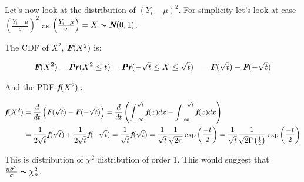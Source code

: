 Let's now look at the distribution of $(Y_i -\mu)^2$. For simplicity let's look at case $\left(\frac{Y_i -\mu}{\sigma}\right)^2$ as $\left(\frac{Y_i -\mu}{\sigma}\right) = X \thicksim \textbf{\em N}(0,1)$.

The CDF of $X^2$, $\textbf{\em F}(X^2)$ is:

\begin{equation}
\begin{aligned}
\textbf{\em F}(X^2) & = \textbf{\em Pr}(X^2 \le t) = \textbf{\em Pr}(-\sqrt{t} \le X \le \sqrt{t}) 																									
								& = \textbf{\em F}(\sqrt{t}) - \textbf{\em F}(-\sqrt{t})					
\end{aligned}
\end{equation}

And the PDF $\textbf{\em f}(X^2):$

\begin{equation}
\begin{aligned}
\textbf{\em f}(X^2) & = \frac{d}{dt}\left(\textbf{\em F}(\sqrt{t}) - \textbf{\em F}(-\sqrt{t})\right) 
								  = \frac{d}{dt}\left(\int_{-\infty}^{\sqrt{t}}\textbf{\em f}(x)dx - \int_{-\infty}^{-\sqrt{t}}\textbf{\em f}(x)dx\right)\\
								& = \frac{1}{2\sqrt{t}}\textbf{\em f}(\sqrt{t}) + \frac{1}{2\sqrt{t}}\textbf{\em f}(-\sqrt{t})
								  = \frac{1}{\sqrt{t}}\textbf{\em f}(\sqrt{t})
								  = \frac{1}{\sqrt{t}}\frac{1}{\sqrt{2\pi}}\exp\left(\frac{-t}{2}\right)
									= \frac{1}{\sqrt{t}}\frac{1}{\sqrt{2}\Gamma\left(\frac{1}{2}\right)}\exp\left(\frac{-t}{2}\right)
\end{aligned}
\end{equation}

This is distribution of $\chi^2$ distribution of order 1. This would suggest that $\frac{n\hat{\sigma}^2}{\sigma} \thicksim \chi_n^2$.

